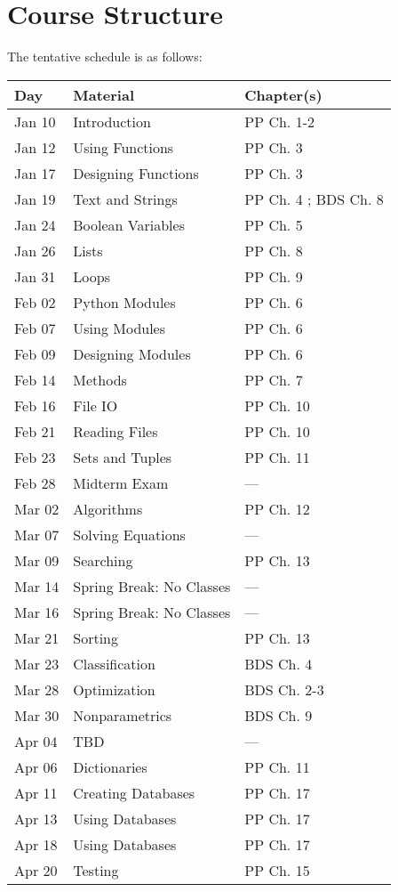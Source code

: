\documentclass[11pt]{paper}
\begin{document}
\section{Course Structure}

The tentative schedule is as follows:   

\begin{center}
\begin{tabular}{| l | l | l |}\hline
 Day & Material & Chapter(s) \\\hline 
 Jan 10 & Introduction & PP Ch. 1-2 \\
 Jan 12 & Using Functions & PP Ch. 3 \\
 Jan 17 & Designing Functions & PP Ch. 3 \\
 Jan 19 & Text and Strings & PP Ch. 4 ; BDS Ch. 8 \\
 Jan 24 & Boolean Variables & PP Ch. 5\\
 Jan 26 & Lists & PP Ch. 8 \\
 Jan 31 & Loops & PP Ch. 9\\
 Feb 02 & Python Modules & PP Ch. 6 \\
 Feb 07 & Using Modules & PP Ch. 6 \\
 Feb 09 & Designing Modules & PP Ch. 6 \\
 Feb 14 & Methods & PP Ch. 7\\
 Feb 16 & File IO & PP Ch. 10 \\
 Feb 21 & Reading Files & PP Ch. 10 \\
 Feb 23 & Sets and Tuples & PP Ch. 11 \\
 Feb 28 & Midterm Exam & --- \\
 Mar 02 & Algorithms & PP Ch. 12 \\
 Mar 07 & Solving Equations & --- \\
 Mar 09 & Searching & PP Ch. 13 \\
 Mar 14 & Spring Break: No Classes & --- \\
 Mar 16 & Spring Break: No Classes & --- \\
 Mar 21 & Sorting & PP Ch. 13\\
 Mar 23 & Classification & BDS Ch. 4 \\
 Mar 28 & Optimization & BDS Ch. 2-3 \\
 Mar 30 & Nonparametrics & BDS Ch. 9 \\
 Apr 04 & TBD & --- \\
 Apr 06 & Dictionaries & PP Ch. 11 \\
 Apr 11 & Creating Databases & PP Ch. 17 \\
 Apr 13 & Using Databases & PP Ch. 17 \\
 Apr 18 & Using Databases & PP Ch. 17 \\
 Apr 20 & Testing & PP Ch. 15 \\\hline
\end{tabular}
\end{center}
\end{document}
